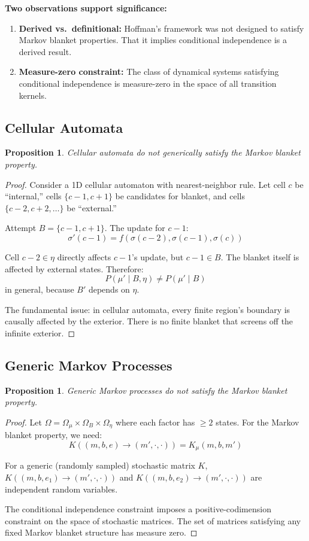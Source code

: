 \documentclass[11pt,a4paper]{article}
\theoremstyle{definition}
\theoremstyle{plain}
\newtheorem{proposition}[definition]{Proposition}
\theoremstyle{remark}
\begin{document}
\textbf{Two observations support significance:}
\begin{enumerate}
    \item \textbf{Derived vs.\ definitional:} Hoffman's framework was not designed to satisfy Markov blanket properties. That it implies conditional independence is a derived result.
    \item \textbf{Measure-zero constraint:} The class of dynamical systems satisfying conditional independence is measure-zero in the space of all transition kernels.
\end{enumerate}

\subsection{Cellular Automata}

\begin{proposition}\label{prop:ca}
Cellular automata do not generically satisfy the Markov blanket property.
\end{proposition}

\begin{proof}
Consider a 1D cellular automaton with nearest-neighbor rule. Let cell $c$ be ``internal,'' cells $\{c-1, c+1\}$ be candidates for blanket, and cells $\{c-2, c+2, \ldots\}$ be ``external.''

Attempt $B = \{c-1, c+1\}$. The update for $c-1$:
\[
\sigma'(c-1) = f(\sigma(c-2), \sigma(c-1), \sigma(c))
\]

Cell $c-2 \in \eta$ directly affects $c-1$'s update, but $c-1 \in B$. The blanket itself is affected by external states. Therefore:
\[
P(\mu' \mid B, \eta) \neq P(\mu' \mid B)
\]
in general, because $B'$ depends on $\eta$.

The fundamental issue: in cellular automata, every finite region's boundary is causally affected by the exterior. There is no finite blanket that screens off the infinite exterior.
\end{proof}

\subsection{Generic Markov Processes}

\begin{proposition}\label{prop:generic-markov}
Generic Markov processes do not satisfy the Markov blanket property.
\end{proposition}

\begin{proof}
Let $\Omega = \Omega_\mu \times \Omega_B \times \Omega_\eta$ where each factor has $\geq 2$ states. For the Markov blanket property, we need:
\[
K((m, b, e) \to (m', \cdot, \cdot)) = K_\mu(m, b, m')
\]

For a generic (randomly sampled) stochastic matrix $K$, $K((m, b, e_1) \to (m', \cdot, \cdot))$ and $K((m, b, e_2) \to (m', \cdot, \cdot))$ are independent random variables.

The conditional independence constraint imposes a positive-codimension constraint on the space of stochastic matrices. The set of matrices satisfying any fixed Markov blanket structure has measure zero.
\end{proof}
\end{document}
